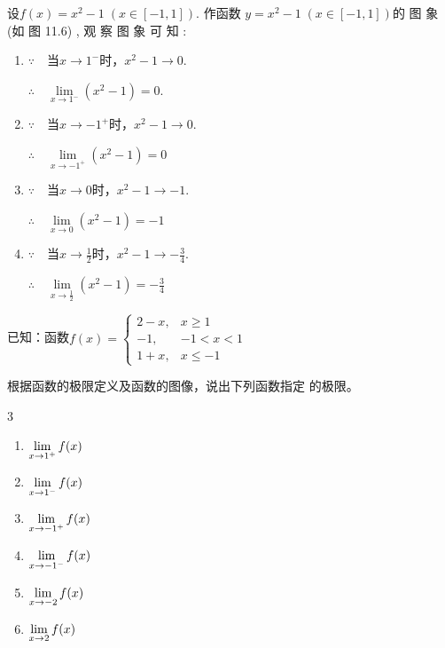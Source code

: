 \begin{solution}
设$f( x) = x^2- 1\; (x\in [ - 1,1])$. 作函数 $y= x^2- 1\; ( x\in [ - 1, 1] )$的 图 象 (如 图  11.6) , 观 察 图 象 可 知 : 

\noindent
\begin{minipage}{.5\textwidth}
\begin{enumerate}[(1)]
    \item $\because\quad $当$x\to1^-$时，$x^2-1\to0$.
    
    $\therefore\quad \lim\limits_{x\to 1^{- }}( x^{2}- 1) = 0.$
    
\item      $\because\quad $当$x\to -1^+$时，$x^2-1\to0$.
    
   $\therefore\quad \lim\limits_{x\to -1^{+ }}( x^{2}- 1) = 0$

   \item      $\because\quad $当$x\to 0$时，$x^2-1\to-1$.
    
   $\therefore\quad \lim\limits_{x\to 0}( x^{2}- 1) = -1$

   \item      $\because\quad $当$x\to \frac{1}{2}$时，$x^2-1\to -\frac{3}{4}$.
    
   $\therefore\quad \lim\limits_{x\to \tfrac{1}{2}}( x^{2}- 1) = -\frac{3}{4}$
\end{enumerate}    
\end{minipage}
\hfill
\begin{minipage}{.4\textwidth}
    \centering
{}
\end{minipage}

\end{solution}

\begin{example}
已知：函数$f(x)=\begin{cases}
    2-x,& x\ge 1\\
    -1,& -1<x<1\\
    1+x,& x\le -1
\end{cases}$

根据函数的极限定义及函数的图像，说出下列函数指定
的极限。
\begin{multicols}{3}
\begin{enumerate}[(1)]
    \item $\lim\limits_{x\to 1^+}f(x)$
    \item $\lim\limits_{x\to 1^-}f(x)$
    \item $\lim\limits_{x\to -1^+}f(x)$
    \item $\lim\limits_{x\to -1^-}f(x)$
    \item $\lim\limits_{x\to -2}f(x)$
    \item $\lim\limits_{x\to 2}f(x)$
\end{enumerate}
\end{multicols}
\end{example}

